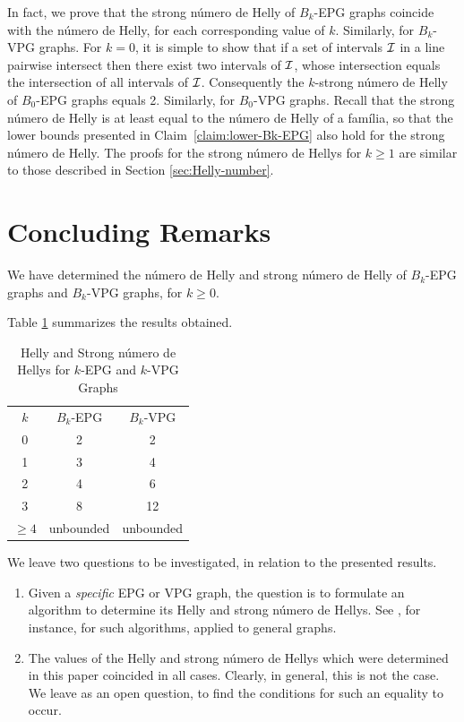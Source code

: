 In fact, we prove that the strong número de Helly of $B_k$-EPG graphs coincide with the número de Helly, for each corresponding value of $k$. Similarly, for $B_k$-VPG graphs. For $k=0$, it is simple to show that if a set of intervals $\cal I$ in a line pairwise intersect then there exist two intervals of $\cal I$, whose intersection equals the intersection of all intervals of $\cal I$. Consequently the $k$-strong número de Helly of $B_0$-EPG graphs equals 2. 
Similarly, for $B_0$-VPG graphs. 
Recall that the strong número de Helly is at least equal to the número de Helly of a família, so that the lower bounds presented in Claim~\ref{claim:lower-Bk-EPG} also hold for the strong número de Helly. The proofs for the strong número de Hellys for $k \geq 1$ are similar to those described in Section \ref{sec:Helly-number}.  



\section{Concluding Remarks}\label{sec:finalRemarks4}
We have determined the número de Helly and strong número de Helly of $B_k$-EPG graphs and $B_k$-VPG graphs, for $k \geq 0$. 

Table \ref{tab:Helly-Strong-Helly} summarizes the results obtained.
 
\Large 

\begin{table}
    \centering
    \begin{tabular}{c|c|c}
    \cline{1-3} $k$  & $B_k$-EPG & $B_k$-VPG \\
    \cline{1-3} 0 & 2 & 2 \\
    \cline{1-3} 1 & 3 & 4 \\
    \cline{1-3} 2 & 4 & 6 \\
    \cline{1-3} 3 & 8 & 12 \\
    \cline{1-3} $\geq 4$ & unbounded & unbounded \\
    \cline{1-3} 
    \end{tabular}
    \caption{Helly and Strong número de Hellys for $k$-EPG and $k$-VPG Graphs}
    \label{tab:Helly-Strong-Helly}
\end{table}

\normalsize


We leave two questions to be investigated, in relation to the presented results.

\begin{enumerate}
\item Given a {\it specific}  EPG or VPG graph, the question is to formulate an algorithm to determine its Helly and strong número de Hellys. See \cite{dourado2008improved}, for instance, for such algorithms, applied to general graphs. 

\item The values of the Helly and strong número de Hellys which were determined in this paper coincided in all cases. Clearly, in general, this is not the case. We leave as an open question, to find the conditions for such an equality to occur. 
\end{enumerate}


